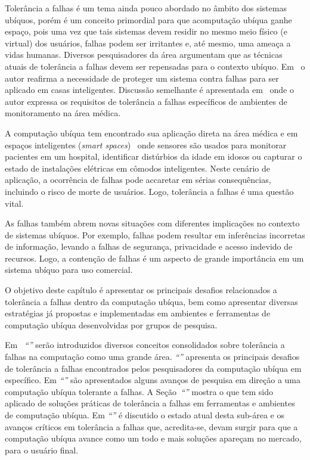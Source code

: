 \documentclass{SBCbookchapter}
\begin{document}
Tolerância a falhas é um tema ainda pouco abordado no âmbito dos sistemas ubíquos, porém é um conceito primordial para que acomputação ubíqua ganhe espaço, pois uma vez que tais sistemas devem residir no mesmo meio físico (e virtual) dos usuários, falhas podem ser irritantes e, até mesmo, uma ameaça a vidas humanas. Diversos pesquisadores da área argumentam que as técnicas atuais de tolerância a falhas devem ser repensadas para o contexto ubíquo. Em~\cite{Banavar2000} o autor reafirma a necessidade de proteger um sistema contra falhas para ser aplicado em casas inteligentes. Discussão semelhante é apresentada em~\cite{Bohn02} onde o autor expressa os requisitos de tolerância a falhas específicos de ambientes de monitoramento na área médica.

A computação ubíqua tem encontrado sua aplicação direta na área médica\linebreak\cite{Bang03} e em espaços inteligentes (\emph{smart spaces})~\cite{Kidd99} onde sensores são usados para monitorar pacientes em um hospital, identificar distúrbios da idade em idosos ou capturar o estado de instalações elétricas em cômodos inteligentes. Neste cenário de aplicação, a ocorrência de falhas pode accaretar em sérias consequências, incluindo o risco de morte de usuários. Logo, tolerância a falhas é uma questão vital.

As falhas também abrem novas situações com diferentes implicações no contexto de sistemas ubíquos. Por exemplo, falhas podem resultar em inferências incorretas de informação, levando a falhas de segurança, privacidade e acesso indevido de recursos. Logo, a contenção de falhas é um aspecto de grande importância em um sistema ubíquo para uso comercial.

O objetivo deste capítulo é apresentar os principais desafios relacionados a tolerância a falhas dentro da computação ubíqua, bem como apresentar diversas estratégias já propostas e implementadas em ambientes e ferramentas de computação ubíqua desenvolvidas por grupos de pesquisa.

Em ~\emph{``''} serão introduzidos diversos conceitos consolidados sobre tolerância a falhas na computação como uma grande área. \emph{``''} apresenta os principais desafios de tolerância a falhas encontrados pelos pesquisadores da computação ubíqua em específico. Em \emph{``''} são apresentados alguns avanços de pesquisa em direção a uma computação ubíqua tolerante a falhas. A Seção~\emph{``''} mostra o que tem sido aplicado de soluções práticas de tolerância a falhas em ferramentas e ambientes de computação ubíqua. Em \emph{``''} é discutido o estado atual desta sub-área e os avanços críticos em tolerância a falhas que, acredita-se, devam surgir para que a computação ubíqua avance como um todo e mais soluções apareçam no mercado, para o usuário final.
\end{document}
